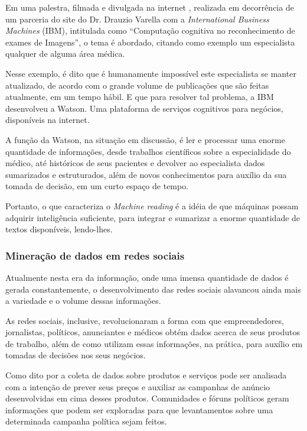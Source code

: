 Em uma palestra, filmada e divulgada na internet \cite{drauzioYoutube}, realizada em decorrência de um parceria do site do Dr. Drauzio Varella com a \textit{International Business Machines} (IBM), intitulada como “Computação cognitiva no reconhecimento de exames de Imagens”, o tema é abordado, citando como exemplo um especialista qualquer de alguma área médica.

Nesse exemplo, é dito que é humanamente impossível este especialista se manter atualizado, de acordo com o grande volume de publicações que são feitas atualmente, em um tempo hábil. E que para resolver tal problema, a IBM desenvolveu a Watson. Uma plataforma de serviços cognitivos para negócios, disponíveis na internet.

A função da Watson, na situação em discussão, é ler e processar uma enorme quantidade de informações, desde trabalhos científicos sobre a especialidade do médico, até históricos de seus pacientes e devolver ao especialista dados sumarizados e estruturados, além de novos conhecimentos para auxílio da sua tomada de decisão, em um curto espaço de tempo.

Portanto, o que caracteriza o \textit{Machine reading} é a idéia de que máquinas possam adquirir inteligência suficiente, para integrar e sumarizar a enorme quantidade de textos disponíveis, lendo-lhes.

\subsubsection{Mineração de dados em redes sociais}

Atualmente nesta era da informação, onde uma imensa quantidade de dados é gerada constantemente, o desenvolvimento das redes sociais alavancou ainda mais a variedade e o volume dessas informações.

As redes sociais, inclusive, revolucionaram a forma com que empreendedores, jornalistas, políticos, anunciantes e médicos obtém dados acerca de seus produtos de trabalho, além de como utilizam essas informações, na prática, para auxílio em tomadas de decisões nos seus negócios.

Como dito por \cite{Hirschberg261} a coleta de dados sobre produtos e serviços pode ser analisada com a intenção de prever seus preços e auxiliar as campanhas de anúncio desenvolvidas em cima desses produtos. Comunidades e fóruns políticos geram informações que podem ser exploradas para que levantamentos sobre uma determinada campanha política sejam feitos.

